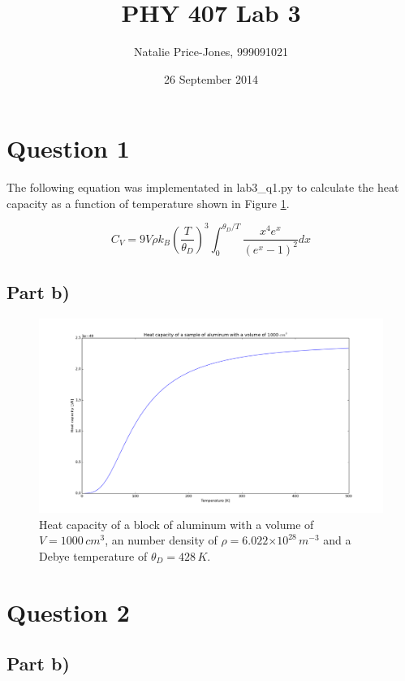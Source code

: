 \documentclass[a4paper,12pt]{article}
\providecommand{\e}[1]{\ensuremath{\times 10^{#1}}}
\begin{document}
\onehalfspacing
\title{PHY 407 Lab 3}
\author{Natalie Price-Jones, 999091021}
\date{26 September 2014}
\maketitle

\section{Question 1}

The following equation was implementated in lab3\_q1.py to calculate the heat capacity as a function of temperature shown in Figure \ref{fig:q1}.

\begin{equation}
C_V = 9V\rho k_B\left(\frac{T}{\theta_D}\right)^3\int_0^{\theta_D/T}\frac{x^4e^x}{(e^x - 1)^2}dx
\label{eqn:Cv}
\end{equation}

\subsection{Part b)}

\begin{figure}[H]
\centering
\includegraphics[width = \linewidth]{lab3q1.png}
\caption{Heat capacity of a block of aluminum with a volume of $ V = 1000\,cm^3$, an number density of $\rho = 6.022\e{28}\, m^{-3}$ and a Debye temperature of $\theta_D = 428\,K$.}
\label{fig:q1}
\end{figure}

\section{Question 2}
\subsection{Part b)}
\end{document}
